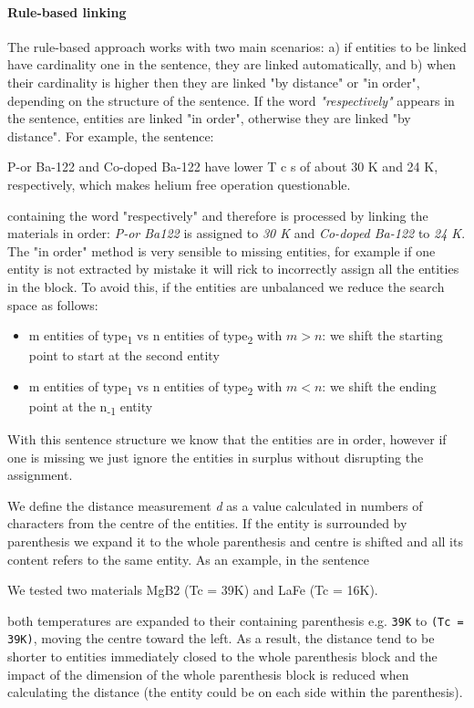 \documentclass{article}
\begin{document}
\paragraph{Rule-based linking}
The rule-based approach works with two main scenarios: a) if entities to be linked have cardinality one in the sentence, they are linked automatically, and b) when their cardinality is higher then they are linked "by distance" or "in order", depending on the structure of the sentence. 
If the word \textit{"respectively"} appears in the sentence, entities are linked "in order", otherwise they are linked "by distance". 
For example, the sentence:  
\begin{displayquote}
P-or Ba-122  and Co-doped Ba-122 have lower T c s of about 30 K and 24 K, respectively, which makes helium free operation questionable.
\end{displayquote}
containing the word "respectively" and therefore is processed by linking the materials in order: \textit{P-or Ba122} is assigned to \textit{30 K} and \textit{Co-doped Ba-122} to \textit{24 K}.
The "in order" method is very sensible to missing entities, for example if one entity is not extracted by mistake it will rick to incorrectly assign all the entities in the block. To avoid this, if the entities are unbalanced we reduce the search space as follows: 
\begin{itemize}
    \item m entities of type\textsubscript{1} vs n entities of type\textsubscript{2} with $m > n$: we shift the starting point to start at the second entity 
    \item m entities of type\textsubscript{1} vs n entities of type\textsubscript{2} with $m < n$: we shift the ending point at the n\textsubscript{-1} entity
\end{itemize}
With this sentence structure we know that the entities are in order, however if one is missing we just ignore the entities in surplus without disrupting the assignment. 

We define the distance measurement \textit{d} as a value calculated in numbers of characters from the centre of the entities. 
If the entity is surrounded by parenthesis we expand it to the whole parenthesis and centre is shifted and all its content refers to the same entity. 
As an example, in the sentence
\begin{displayquote}
We tested two materials MgB2 (Tc = 39K) and LaFe (Tc = 16K).
\end{displayquote}
both temperatures are expanded to their containing parenthesis e.g. \texttt{39K} to \texttt{(Tc = 39K)}, moving the centre toward the left. 
As a result, the distance tend to be shorter to entities immediately closed to the whole parenthesis block and the impact of the dimension of the whole parenthesis block is reduced when calculating the distance (the entity could be on each side within the parenthesis). 
\end{document}
